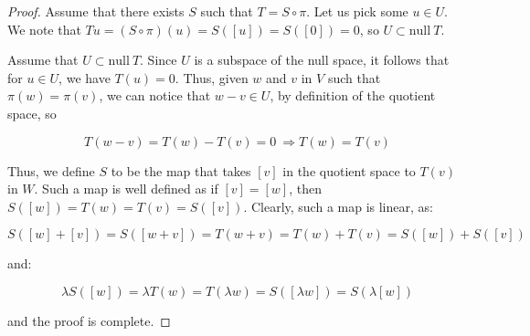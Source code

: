 \documentclass[10pt, oneside]{article}
\begin{document}
    \begin{proof}

      Assume that there exists $S$ such that $T = S \circ \pi$. Let us pick some $u \in U$. We note that $Tu = (S \circ \pi)(u) = S([u]) = S([0]) = 0$,
      so $U \subset \text{null} \ T$.
      \newline

      Assume that $U \subset \text{null} \ T$. Since $U$ is a subspace of the null space, it follows that for $u \in U$, we have $T(u) = 0$. Thus,
      given $w$ and $v$ in $V$ such that $\pi(w) = \pi(v)$, we can notice that $w - v \in U$, by definition of the quotient space, so

      $$T(w - v) = T(w) - T(v) = 0 \ \Rightarrow T(w) = T(v)$$

      Thus, we define $S$ to be the map that takes $[v]$ in the quotient space to $T(v)$ in $W$. Such a map is well defined as if $[v] = [w]$, then
      $S([w]) = T(w) = T(v) = S([v])$. Clearly, such a map is linear, as:

      $$S([w] + [v]) = S([w + v]) = T(w + v) = T(w) + T(v) = S([w]) + S([v])$$

      and:

      $$\lambda S([w]) = \lambda T(w) = T(\lambda w) = S([\lambda w]) = S(\lambda [w])$$

      and the proof is complete.

    \end{proof}

    
\end{document}
